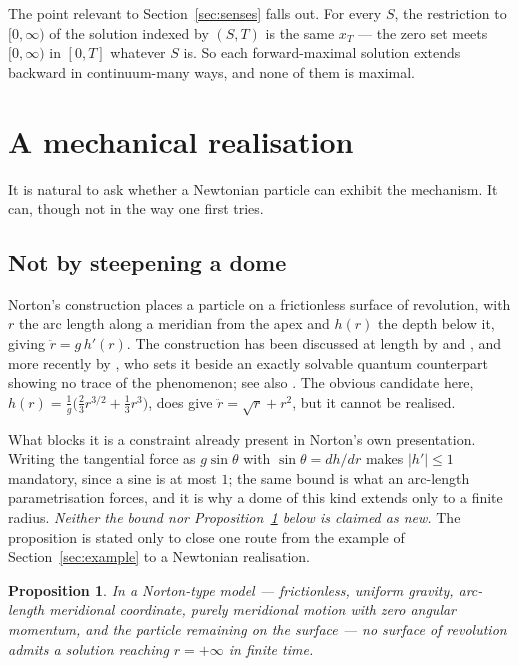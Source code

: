 \documentclass[12pt]{article}
\theoremstyle{plain}
\newtheorem{proposition}[theorem]{Proposition}
\theoremstyle{definition}
\theoremstyle{remark}
\begin{document}
The point relevant to Section~\ref{sec:senses} falls out. For every $S$, the
restriction to $[0,\infty)$ of the solution indexed by $(S,T)$ is the same
$x_{T}$ --- the zero set meets $[0,\infty)$ in $[0,T]$ whatever $S$ is. So each
forward-maximal solution extends backward in continuum-many ways, and none of
them is maximal.

\section{A mechanical realisation}\label{app:mechanical}

It is natural to ask whether a Newtonian particle can exhibit the mechanism. It
can, though not in the way one first tries.

\subsection{Not by steepening a dome}

Norton's construction \citep{Norton} places a particle on a frictionless surface
of revolution, with $r$ the arc length along a meridian from the apex and $h(r)$
the depth below it, giving $\ddot r=g\,h'(r)$. The construction has been
discussed at length by \citet{Malament} and \citet{Fletcher}, and more
recently by \citet{Berry}, who sets it beside an exactly solvable quantum
counterpart showing no trace of the phenomenon; see also
\citet{BhatBernstein}.
The obvious candidate here,
$h(r)=\tfrac1g\big(\tfrac23 r^{3/2}+\tfrac13 r^{3}\big)$, does give
$\ddot r=\sqrt r+r^{2}$, but it cannot be realised.

What blocks it is a constraint already present in Norton's own presentation.
Writing the tangential force as $g\sin\theta$ with $\sin\theta=dh/dr$
\citep{Norton} makes $|h'|\le1$ mandatory, since a sine is at most $1$; the same
bound is what an arc-length parametrisation forces, and it is why a dome of this
kind extends only to a finite radius. \emph{Neither the bound nor
Proposition~\ref{prop:dome} below is claimed as new.} The proposition is stated
only to close one route from the example of Section~\ref{sec:example} to a
Newtonian realisation.

\begin{proposition}\label{prop:dome}
In a Norton-type model --- frictionless, uniform gravity, arc-length meridional
coordinate, purely meridional motion with zero angular momentum, and the
particle remaining on the surface --- no surface of revolution admits a solution
reaching $r=+\infty$ in finite time.
\end{proposition}
\end{document}
